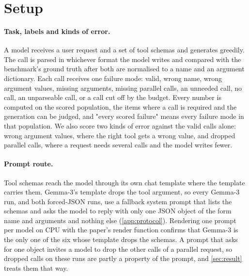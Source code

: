 \section{Setup}
\label{sec:setup}

\paragraph{Task, labels and kinds of error.}
A model receives a user request and a set of tool schemas and generates greedily. The call is parsed in whichever format the model writes and compared with the benchmark's ground truth after both are normalised to a name and an argument dictionary. Each call receives one failure mode: valid, wrong name, wrong argument values, missing arguments, missing parallel calls, an unneeded call, no call, an unparseable call, or a call cut off by the budget. Every number is computed on the scored population, the items where a call is required and the generation can be judged, and "every scored failure" means every failure mode in that population. We also score two kinds of error against the valid calls alone: wrong argument values, where the right tool gets a wrong value, and dropped parallel calls, where a request needs several calls and the model writes fewer.

\paragraph{Prompt route.}
Tool schemas reach the model through its own chat template where the template carries them. Gemma-3's template drops the tool argument, so every Gemma-3 run, and both forced-JSON runs, use a fallback system prompt that lists the schemas and asks the model to reply with only one JSON object of the form name and arguments and nothing else (\cref{app:protocol}). Rendering one prompt per model on CPU with the paper's render function confirms that Gemma-3 is the only one of the six whose template drops the schemas. A prompt that asks for one object invites a model to drop the other calls of a parallel request, so dropped calls on these runs are partly a property of the prompt, and \cref{sec:result} treats them that way.

